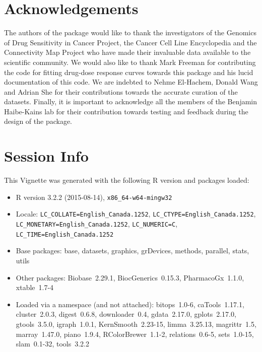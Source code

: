 \documentclass[11pt]{article}
\begin{document}
\section{Acknowledgements}
The authors of the package would like to thank the investigators of the Genomics of Drug Sensitivity in Cancer Project, the Cancer Cell Line Encyclopedia and the Connectivity Map Project who have made their invaluable data available to the scientific community. We would also like to thank Mark Freeman for contributing the code for fitting drug-dose response curves towards this package and his lucid documentation of this code. We are indebted to Nehme El-Hachem, Donald Wang and Adrian She for their contributions towards the accurate curation of the datasets. Finally, it is important to acknowledge all the members of the Benjamin Haibe-Kains lab for their contribution towards testing and feedback during the design of the package.\\

\section*{Session Info}

This Vignette was generated with the following R version and packages loaded:

\begin{itemize}\raggedright
  \item R version 3.2.2 (2015-08-14), \verb|x86_64-w64-mingw32|
  \item Locale: \verb|LC_COLLATE=English_Canada.1252|, \verb|LC_CTYPE=English_Canada.1252|, \verb|LC_MONETARY=English_Canada.1252|, \verb|LC_NUMERIC=C|, \verb|LC_TIME=English_Canada.1252|
  \item Base packages: base, datasets, graphics, grDevices, methods,
    parallel, stats, utils
  \item Other packages: Biobase~2.29.1, BiocGenerics~0.15.3,
    PharmacoGx~1.1.0, xtable~1.7-4
  \item Loaded via a namespace (and not attached): bitops~1.0-6,
    caTools~1.17.1, cluster~2.0.3, digest~0.6.8, downloader~0.4,
    gdata~2.17.0, gplots~2.17.0, gtools~3.5.0, igraph~1.0.1,
    KernSmooth~2.23-15, limma~3.25.13, magrittr~1.5, marray~1.47.0,
    piano~1.9.4, RColorBrewer~1.1-2, relations~0.6-5, sets~1.0-15,
    slam~0.1-32, tools~3.2.2
\end{itemize}


\end{document}
